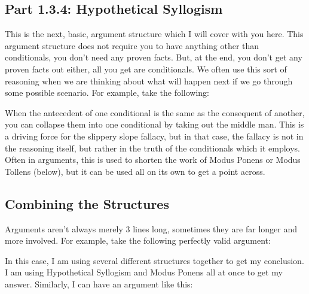 \subsection{Part 1.3.4: Hypothetical Syllogism}
\label{s:p1.3.4}

This is the next, basic, argument structure which I will cover with you here. This argument structure does not require you to have anything other than conditionals, you don't need any proven facts. But, at the end, you don't get any proven facts out either, all you get are conditionals. We often use this sort of reasoning when we are thinking about what will happen next if we go through some possible scenario. For example, take the following:


When the antecedent of one conditional is the same as the consequent of another, you can collapse them into one conditional by taking out the middle man. This is a driving force for the slippery slope fallacy, but in that case, the fallacy is not in the reasoning itself, but rather in the truth of the conditionals which it employs. Often in arguments, this is used to shorten the work of Modus Ponens or Modus Tollens (below), but it can be used all on its own to get a point across. 

\subsection{Combining the Structures}

Arguments aren't always merely 3 lines long, sometimes they are far longer and more involved. For example, take the following perfectly valid argument:


In this case, I am using several different structures together to get my conclusion. I am using Hypothetical Syllogism and Modus Ponens all at once to get my answer. Similarly, I can have an argument like this:


